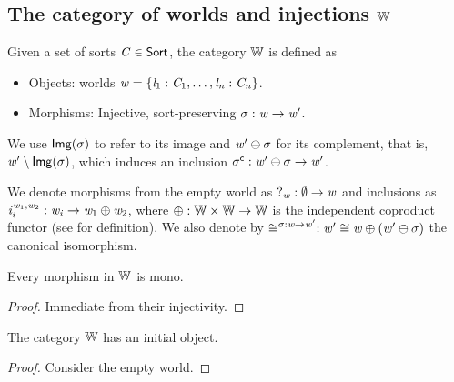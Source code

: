 
\subsection[Category of Worlds and Injections]{The category of worlds and injections $\mathbb{W}$}

Given a set of sorts $\mathit{C} \in \mathsf{Sort}$, the category $\mathbb{W}$ is defined as
\begin{itemize}
    \item Objects: worlds $\mathit{w} = \{ \mathit{l}_1 : \mathit{C}_1, \dots, \mathit{l}_{\mathit{n}} : \mathit{C}_{\mathit{n}} \}$.
    \item Morphisms: Injective, sort-preserving $\sigma : \mathit{w} \to \mathit{w}'$.
\end{itemize}

\begin{notation}
We use $\mathsf{Img}(\sigma)$ to refer to its image and $\mathit{w}' \ominus \sigma$ for its complement, that is, $\mathit{w}' \setminus \mathsf{Img}(\sigma)$, 
which induces an inclusion ${\sigma}^\mathsf{c} : \mathit{w}' \ominus \sigma \to \mathit{w}'$.

We denote morphisms from the empty world as $?_{\mathit{w}} : \emptyset \to \mathit{w}$ and inclusions as $\mathit{i}_{\mathit{i}}^{\mathit{w}_1,\mathit{w}_2} : \mathit{w}_{\mathit{i}} \to \mathit{w}_1 \oplus \mathit{w}_2$, 
where $\oplus : \mathbb{W} \times \mathbb{W} \to \mathbb{W}$ is the independent coproduct functor (see \cite{kammar2017monad} for definition).
We also denote by $\cong^{\sigma : \mathit{w} \to \mathit{w}'} : \mathit{w}' \cong \mathit{w} \oplus (\mathit{w}' \ominus \sigma)$ the canonical isomorphism.
\end{notation}

\begin{lemma}\label{lem:monos-W}
    Every morphism in $\mathbb{W}$ is mono.
\end{lemma}
\begin{proof}Immediate from their injectivity.\end{proof}

\begin{lemma}
    The category $\mathbb{W}$ has an initial object.
\end{lemma}
\begin{proof}Consider the empty world.\end{proof}

